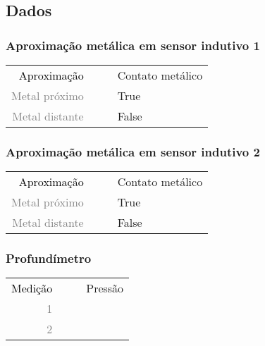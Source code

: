 



\subsection{Dados}
\subsubsection{Aproximação metálica em sensor indutivo 1}
  \begin{table}[h!]
	\begin{tabular}{r l|l p{12cm} }
		\textcolor{black}{Aproximação} &&& 	{Contato metálico}\\
		\textcolor{gray}{Metal próximo} &&& 				{True}\\
		\textcolor{gray}{Metal distante} &&& 				{False}\\
 	\end{tabular}
\end{table}

\subsubsection{Aproximação metálica em sensor indutivo 2}
  \begin{table}[h!]
	\begin{tabular}{r l|l p{12cm} }
		\textcolor{black}{Aproximação} &&& 	{Contato metálico}\\
		\textcolor{gray}{Metal próximo} &&& 				{True}\\
		\textcolor{gray}{Metal distante} &&& 				{False}\\
 	\end{tabular}
\end{table}

\subsubsection{Profundímetro}
  \begin{table}[h!]
	\begin{tabular}{r l|l p{12cm} }
		\textcolor{black}{Medição} &&& 	{Pressão}\\
		\textcolor{gray}{1} &&& 				{}\\
		\textcolor{gray}{2} &&& 				{}\\
 	\end{tabular}
\end{table}

